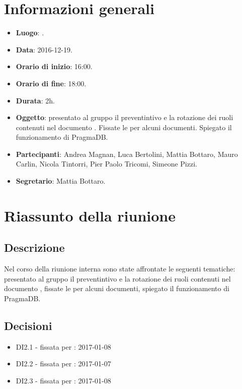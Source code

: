 \documentclass[a4paper,titlepage]{article}
\begin{document}
\maketitle
\begin{diario}
\end{diario}
\newpage
\tableofcontents

\newpage
\section{Informazioni generali}
	\label{sec:Informazioni}

	\begin{itemize}
		\item \textbf{Luogo}: .
		\item \textbf{Data}: 2016-12-19.
		\item \textbf{Orario di inizio}: 16:00.
		\item \textbf{Orario di fine}: 18:00.
		\item \textbf{Durata}: 2h.
		\item \textbf{Oggetto}: presentato al gruppo il preventintivo e la rotazione dei ruoli contenuti nel documento \textit{}. Fissate le  per alcuni documenti. Spiegato il funzionamento di PragmaDB.
		\item \textbf{Partecipanti}: Andrea Magnan, Luca Bertolini, Mattia Bottaro, Mauro Carlin, Nicola Tintorri, Pier Paolo Tricomi, Simeone Pizzi.
		\item \textbf{Segretario}: Mattia Bottaro.
	  
	\end{itemize}

\section{Riassunto della riunione}
	\subsection{Descrizione}
	Nel corso della riunione interna sono state affrontate le seguenti tematiche: presentato al gruppo il preventintivo e la rotazione dei ruoli contenuti nel documento \PPdocRR{}, fissate le  per alcuni documenti, spiegato il funzionamento di PragmaDB.
	
	\subsection{Decisioni}
		\begin{itemize}
			\item DI2.1 -  fissata per \PQdocRR{}: 2017-01-08
			\item DI2.2 -  fissata per \ARdocRR{}: 2017-01-07
			\item DI2.3 -  fissata per \Gldoc{}: 2017-01-08
		\end{itemize}
\end{document}
